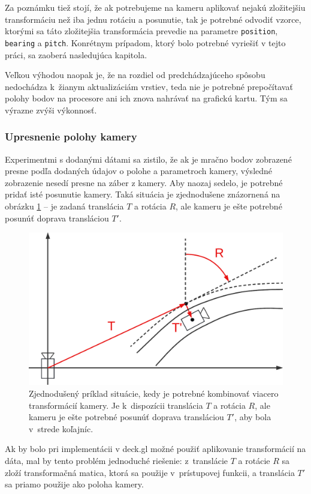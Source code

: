 Za poznámku tiež stojí, že ak potrebujeme na kameru aplikovať nejakú zložitejšiu transformáciu než iba jednu rotáciu a posunutie, tak je potrebné odvodiť vzorce, ktorými sa táto zložitejšia transformácia prevedie na parametre \texttt{position}, \texttt{bearing} a \texttt{pitch}. Konrétnym prípadom, ktorý bolo potrebné vyriešiť v tejto práci, sa zaoberá nasledujúca kapitola.

Veľkou výhodou naopak je, že na rozdiel od predchádzajúceho spôsobu nedochádza k~žianym aktualizáciám vrstiev, teda nie je potrebné prepočítavať polohy bodov na procesore ani ich znova nahrávať na grafickú kartu. Tým sa výrazne zvýši výkonnosť.

\subsubsection{Upresnenie polohy kamery}

Experimentmi s dodanými dátami sa zistilo, že ak je mračno bodov zobrazené presne podľa dodaných údajov o polohe a parametroch kamery, výsledné zobrazenie nesedí presne na záber z kamery. Aby naozaj sedelo, je potrebné pridať isté posunutie kamery. Taká situácia je zjednodušene znázornená na obrázku \ref{fig:transformacie_kamery} -- je zadaná translácia $T$ a rotácia $R$, ale kameru je ešte potrebné posunúť doprava transláciou $T'$.

\begin{figure}[h]
    \centering
    \includegraphics[width=0.8\linewidth]{text_prace/obrazky-figures/tri_transformacie.pdf}
    \caption{Zjednodušený príklad situácie, kedy je potrebné kombinovať viacero transformácií kamery. Je k~dispozícii translácia $T$ a rotácia $R$, ale kameru je ešte potrebné posunúť doprava transláciou $T'$, aby bola v~strede koľajníc.}
    \label{fig:transformacie_kamery}
\end{figure}

Ak by bolo pri implementácii v deck.gl možné použiť aplikovanie transformácií na dáta, mal by tento problém jednoduché riešenie: z~translácie $T$ a rotácie $R$ sa zloží transformačná matica, ktorá sa použije v~prístupovej funkcii, a translácia $T'$ sa priamo použije ako poloha kamery.

